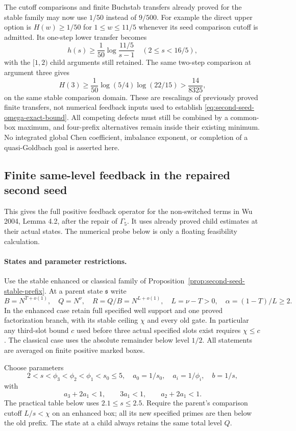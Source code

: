 \documentclass[11pt]{article}
\begin{document}
The cutoff comparisons and finite Buchstab transfers already proved
for the stable family may now use $1/50$ instead of $9/500$.
For example the direct upper option is $H(w)\ge1/50$ for
$1\le w\le11/5$ whenever its seed comparison cutoff is admitted.
Its one-step lower transfer becomes
\[
 h(s)\ge\frac1{50}\log\frac{11/5}{s-1}
 \quad(2\le s<16/5),
\]
with the $[1,2)$ child arguments still retained.  The same two-step
comparison at argument three gives
\[
 H(3)\ge\frac1{50}\log(5/4)\log(22/15)
 >\frac{14}{8325},
\]
on the same stable comparison domain.  These are rescalings of
previously proved finite transfers, not numerical feedback inputs
used to establish \eqref{eq:second-seed-omega-exact-bound}.
All competing defects must still be combined by a common-box
maximum, and four-prefix alternatives remain inside their existing
minimum.  No integrated global Chen coefficient, imbalance
exponent, or completion of a quasi-Goldbach goal is asserted here.

\subsection{Finite same-level feedback in the repaired second seed}
\label{sec:second-seed-finite-feedback}

This gives the full positive feedback operator for the non-switched
terms in Wu 2004, Lemma 4.2, after the repair of $\Gamma_5$.
It uses already proved child estimates at their actual states.
The numerical probe below is only a floating feasibility calculation.

\paragraph{States and parameter restrictions.}
Use the stable enhanced or classical family of
Proposition~\ref{prop:second-seed-stable-prefix}.  At a parent state
$\mathfrak s$ write
\[
 B=N^{T+o(1)},\quad Q=N^\nu,\quad R=Q/B=N^{L+o(1)},\quad
 L=\nu-T>0,\quad \alpha=(1-T)/L\ge2.
\]
In the enhanced case retain full specified well support and one
proved factorization branch, with its stable ceiling $\chi$ and
every old gate.  In particular any third-slot bound $c$ used before
three actual specified slots exist requires $\chi\le c$.
The classical case uses the absolute remainder below level $1/2$.
All statements are averaged on finite positive marked boxes.

Choose parameters
\[
 2<s<\phi_3<\phi_2<\phi_1<s_0\le5,
 \quad a_0=1/s_0,\quad a_i=1/\phi_i,\quad b=1/s,
\]
with
\begin{equation}\label{eq:feedback-parameter-gates}
 a_3+2a_1<1,\qquad 3a_1<1,\qquad a_2+2a_1<1.
\end{equation}
The practical table below uses $2.1\le s\le2.5$.
Require the parent's comparison cutoff $L/s<\chi$ on an enhanced
box; all its new specified primes are then below the old prefix.
The state at a child always retains the same total level $Q$.
\end{document}
